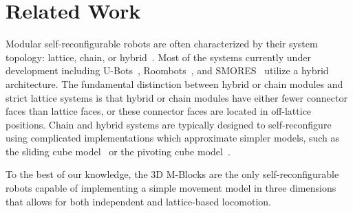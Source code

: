 \section{Related Work}
\label{sec:RelatedWork}

Modular self-reconfigurable robots are often characterized by their
system topology: lattice, chain, or hybrid~\cite{Yim-RAM07}.  Most of
the systems currently under development including U-Bots~\cite{ubot},
Roombots~\cite{roombots3}, and SMORES~\cite{Yim-RAM07} utilize a hybrid
architecture. The fundamental distinction between hybrid or chain modules and
strict lattice systems is that hybrid or chain modules have either fewer
connector faces than lattice faces, or these connector faces are
located in off-lattice positions.  Chain and hybrid
systems are typically designed to self-reconfigure using complicated
implementations which approximate simpler models, such as the sliding cube model~\cite{FitchRus-IROS03} or
the pivoting cube model~\cite{RomanishinRus-IROS13}.

To the best of our knowledge, the 3D M-Blocks are the only
self-reconfigurable robots capable of implementing a simple
movement model in three dimensions that allows for both independent and lattice-based
locomotion.

